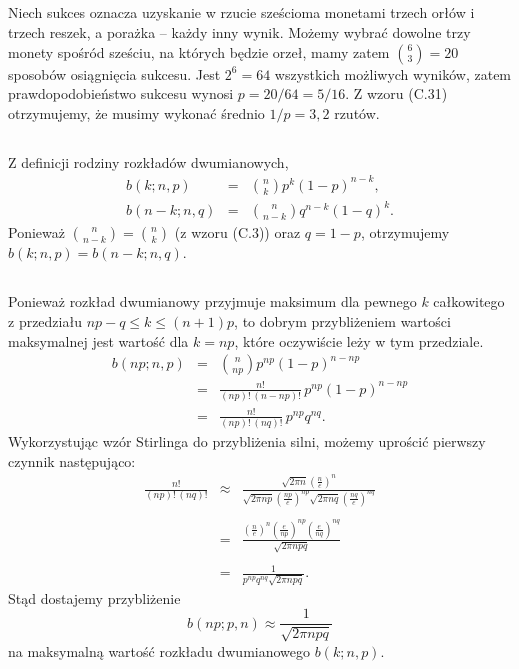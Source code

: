 \subsection{} %
Niech sukces oznacza uzyskanie w rzucie sześcioma monetami trzech orłów i trzech reszek, a porażka -- każdy inny wynik. Możemy wybrać dowolne trzy monety spośród sześciu, na których będzie orzeł, mamy zatem $\binom{6}{3}=20$ sposobów osiągnięcia sukcesu. Jest $2^6=64$ wszystkich możliwych wyników, zatem prawdopodobieństwo sukcesu wynosi $p=20/64=5/16$. Z wzoru (C.31) otrzymujemy, że musimy wykonać średnio $1/p=3{,}2$ rzutów.

\subsection{} %
Z definicji rodziny rozkładów dwumianowych,
\begin{eqnarray*}
	b(k;n,p) &=& \binom{n}{k}p^k(1-p)^{n-k}, \\
	b(n-k;n,q) &=& \binom{n}{n-k}q^{n-k}(1-q)^k.
\end{eqnarray*}
Ponieważ $\binom{n}{n-k}=\binom{n}{k}$ (z wzoru (C.3)) oraz $q=1-p$, otrzymujemy $b(k;n,p)=b(n-k;n,q)$.

\subsection{} %
Ponieważ rozkład dwumianowy przyjmuje maksimum dla pewnego $k$ całkowitego z przedziału $np-q\le k\le(n+1)p$, to dobrym przybliżeniem wartości maksymalnej jest wartość dla $k=np$, które oczywiście leży w tym przedziale.
\begin{eqnarray*}
	b(np;n,p) &=& \binom{n}{np}p^{np}(1-p)^{n-np} \\
	&=& \frac{n!}{(np)!\,(n-np)!}\,p^{np}(1-p)^{n-np} \\
	&=& \frac{n!}{(np)!\,(nq)!}\,p^{np}q^{nq}.
\end{eqnarray*}
Wykorzystując wzór Stirlinga do przybliżenia silni, możemy uprościć pierwszy czynnik następująco:
\begin{eqnarray*}
	\frac{n!}{(np)!\,(nq)!} &\approx& \frac{\sqrt{2\pi n}\left(\frac{n}{e}\right)^n}{\sqrt{2\pi np}\left(\frac{np}{e}\right)^{np}\sqrt{2\pi nq}\left(\frac{nq}{e}\right)^{nq}} \\\\
	&=& \frac{\left(\frac{n}{e}\right)^n\left(\frac{e}{np}\right)^{np}\left(\frac{e}{nq}\right)^{nq}}{\sqrt{2\pi npq}} \\\\
	&=& \frac{1}{p^{np}q^{nq}\sqrt{2\pi npq}}.
\end{eqnarray*}
Stąd dostajemy przybliżenie
\[
	b(np;p,n) \approx \frac{1}{\sqrt{2\pi npq}}
\]
na maksymalną wartość rozkładu dwumianowego $b(k;n,p)$.

